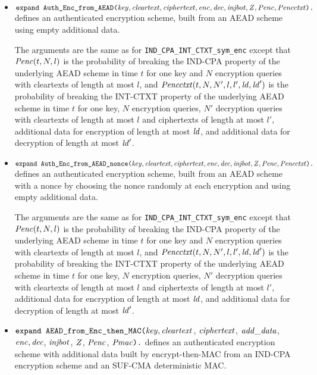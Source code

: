 \documentclass{article}
\begin{document}
\begin{itemize}
 \item 
   $\texttt{expand\ Auth\_Enc\_from\_AEAD(}\vn{key}, \vn{cleartext},
   \vn{ciphertext}, \vn{enc}, \vn{dec}, \vn{injbot}, \vn{Z},
   \vn{Penc}, \vn{Pencctxt}\texttt{).}$ defines an authenticated
   encryption scheme, built from an AEAD scheme using empty additional
   data.

   The arguments are the same as for
   \texttt{IND\_CPA\_INT\_CTXT\_sym\_enc} except that $\mathit{Penc}(t, N,
   l)$ is the probability of breaking the IND-CPA property of the
   underlying AEAD scheme in time $t$ for one key and $N$ encryption
   queries with cleartexts of length at most $l$, and
   $\mathit{Pencctxt}(t, N, N', l, l', \mathit{ld}, \mathit{ld}')$ is the
   probability of breaking the INT-CTXT property of the underlying
   AEAD scheme in time $t$ for one key, $N$ encryption queries, $N'$
   decryption queries with cleartexts of length at most $l$ and
   ciphertexts of length at most $l'$, additional data for encryption
   of length at most $\mathit{ld}$, and additional data for decryption of
   length at most $\mathit{ld}'$.
   
 \item 
   $\texttt{expand\ Auth\_Enc\_from\_AEAD\_nonce(}\vn{key}, \vn{cleartext},
   \vn{ciphertext}, \vn{enc}, \vn{dec}, \vn{injbot}, \vn{Z},
   \vn{Penc}, \vn{Pencctxt}\texttt{).}$ defines an authenticated
   encryption scheme, built from an AEAD scheme with a nonce
   by choosing the nonce randomly at each encryption and
   using empty additional data.

   The arguments are the same as for
   \texttt{IND\_CPA\_INT\_CTXT\_sym\_enc} except that $\mathit{Penc}(t, N,
   l)$ is the probability of breaking the IND-CPA property of the
   underlying AEAD scheme in time $t$ for one key and $N$ encryption
   queries with cleartexts of length at most $l$, and
   $\mathit{Pencctxt}(t, N, N', l, l', \mathit{ld}, \mathit{ld}')$ is the
   probability of breaking the INT-CTXT property of the underlying
   AEAD scheme in time $t$ for one key, $N$ encryption queries, $N'$
   decryption queries with cleartexts of length at most $l$ and
   ciphertexts of length at most $l'$, additional data for encryption
   of length at most $\mathit{ld}$, and additional data for decryption of
   length at most $\mathit{ld}'$.

\item $\texttt{expand AEAD\_from\_Enc\_then\_MAC(}\mathit{key},
  \mathit{cleartext}$, $\mathit{ciphertext}$, $\mathit{add\_data}$, $\mathit{enc},
  \mathit{dec}$, $\mathit{injbot}$, $\mathit{Z}$, $\mathit{Penc}$, $\mathit{Pmac}\texttt{).}$ defines an
authenticated encryption scheme with additional data built by encrypt-then-MAC from an IND-CPA encryption scheme and an SUF-CMA deterministic MAC.


\end{itemize}
\end{document}
